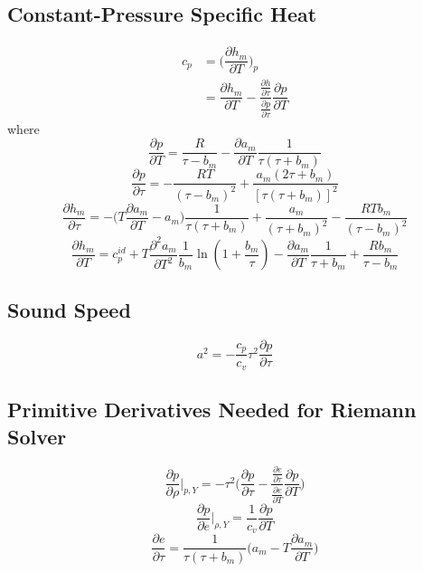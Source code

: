 \subsection*{Constant-Pressure Specific Heat}
\begin{equation}
\begin{split}
c_p &= \biggl(\dfrac{\partial h_m}{\partial T}\biggr)_{p} \\
&= \dfrac{\partial h_m}{\partial T} - \dfrac{\tfrac{\partial h}{\partial \tau}}{\tfrac{\partial p}{\partial \tau}}\dfrac{\partial p}{\partial T}
\end{split}
\end{equation}
where
\begin{equation}
\frac{\partial p}{\partial T}=\frac{R}{\tau-b_m}-\frac{\partial a_m}{\partial T}\frac{1}{\tau(\tau+b_m)}
\end{equation}
\begin{equation}
\frac{\partial p}{\partial \tau}=-\frac{RT}{(\tau-b_m)^2}+\frac{a_m(2\tau+b_m)}{[\tau(\tau+b_m)]^2}
\end{equation}
\begin{equation}
\frac{\partial h_m}{\partial \tau}=-\biggl(T\frac{\partial a_m}{\partial T}-a_m\biggr)\frac{1}{\tau(\tau+b_m)}+\frac{a_m}{(\tau+b_m)^2}-\frac{RTb_m}{(\tau-b_m)^2}
\end{equation}
\begin{equation}
\frac{\partial h_m}{\partial T}=c_{p}^{id}+T\frac{\partial^2 a_m}{\partial T^2}\frac{1}{b_m}\ln(1+\frac{b_m}{\tau})-\frac{\partial a_m}{\partial T}\frac{1}{\tau +b_m}+\frac{Rb_m}{\tau-b_m}
\end{equation}

\subsection*{Sound Speed}
\begin{equation}
a^2=-\frac{c_p}{c_v}\tau^2\frac{\partial p}{\partial \tau}
\end{equation}

\subsection*{Primitive Derivatives Needed for Riemann Solver}
\begin{equation}
\frac{\partial p}{\partial \rho}\bigg|_{p,Y}=-\tau^2\biggl(\frac{\partial p}{\partial \tau}-\dfrac{\frac{\partial e}{\partial \tau}}{\frac{\partial e}{\partial T}}\frac{\partial p}{\partial T}\biggr)
\end{equation}
\begin{equation}
\frac{\partial p}{\partial e}\bigg|_{\rho,Y}=\frac{1}{c_v}\frac{\partial p}{\partial T}
\end{equation}
\begin{equation}
\frac{\partial e}{\partial \tau}=\frac{1}{\tau(\tau+b_m)}\biggl(a_m-T\frac{\partial a_m}{\partial T}\biggr)
\end{equation}


